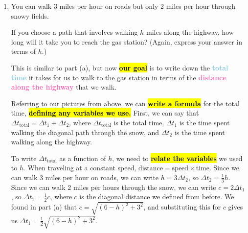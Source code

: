 \documentclass{article}
\newcommand{\goal}[1]{\textbf{\textcolor{skyblue}{#1}}}
\newcommand{\indvar}[1]{\textbf{\textcolor{hotpink}{#1}}}
\begin{document}
\begin{enumerate}
\begin{enumerate}
\begin{solution}
      Now, to write $d$ as a function of $h$, we need to \hl{\textbf{relate the variables}} we used
      by \hl{\textbf{using information we know about the situation}} to replace
      $c$ with an equivalent expression in terms of $h$. Looking at the pictures we drew, we can see that $c$ is the
      hypotenuse of a right triangle, and we can express the lengths of the legs of the right triangle in terms of $h$.
      \begin{center}
      \end{center}
      We can use the Pythagorean theorem to say that $(3-h)^2+3^2=c^2$, and we can solve this for
      $c$ to get
      $c=\sqrt{(6-h)^2+3^2}$. Substituting for $c$ in $d=h+c$, we obtain
      $d=\boxed{h+\sqrt{(6-h)^2+3^2}}$.
    \end{solution}

  \item
    \begin{problem}[\vfill\newpage]
      You can walk 3 miles per hour on roads but only 2 miles per hour through snowy fields.

      If you choose a path that involves walking $h$ miles along the highway, how long will it take you to reach the gas station? (Again, express your answer in terms of $h$.)
    \end{problem}

    \begin{solution}
      This is similar to part (a), but now \hl{\textbf{our goal}} is to write down the \goal{total time} 
      it takes for us to walk to the gas station in terms of the \indvar{distance along the highway} that we walk.
      
      Referring to our pictures from above, we can \hl{\textbf{write a formula}} for the total time,
      \hl{\textbf{defining any variables we use.}} First, we can say that $\Delta t_\text{total} = 
      \Delta t_1 + \Delta t_2$, where
      $\Delta t_\text{total}$ is the total time, $\Delta t_1$ is the time spent walking the diagonal path through the snow, and
      $\Delta t_2$ is the time spent walking along the highway. 

      To write $\Delta t_\text{total}$ as a function of $h$, we need to \hl{\textbf{relate the variables}} we used to
      $h$. When traveling at a constant speed, $\text{distance} = \text{speed} \times \text{time}$. Since we can walk
      3 miles per hour on roads, we can write $h = 3 \Delta t_2$, so $\Delta t_2 = \frac{1}{3}h$. Since we can
      walk 2 miles per hours through the snow, we can write $c = 2 \Delta t_1$, so $\Delta t_1 = \frac{1}{2}c$, where
      $c$ is the diagonal distance we defined from before. We found in part (a) that $c=\sqrt{(6-h)^2+3^2}$, and
      substituting this for $c$ gives us $\Delta t_1 = \frac{1}{2}\sqrt{(6-h)^2+3^2}$.


\end{solution}
\end{enumerate}
\end{enumerate}
\end{document}
